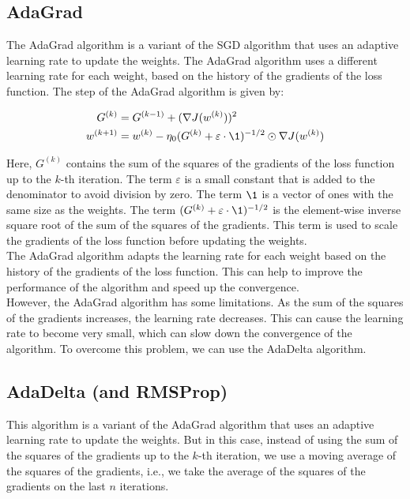 \subsection{AdaGrad}

The AdaGrad algorithm is a variant of the SGD algorithm that uses an adaptive learning rate to
update the weights. The AdaGrad algorithm uses a different learning rate for each weight, based
on the history of the gradients of the loss function. The step of the AdaGrad algorithm is given
by:

\begin{equation}
    \begin{aligned}
        G^{(k)} &= G^{(k-1)} + (\nabla J(w^{(k)}))^2 \\
        w^{(k+1)} &= w^{(k)} - \eta_0 (G^{(k)} + \varepsilon \cdot \1)^{-1/2} \odot \nabla J(w^{(k)})
    \end{aligned}
\end{equation}

Here, $G^{(k)}$ contains the sum of the squares of the gradients of the loss function up to the
$k$-th iteration. The term $\varepsilon$ is a small constant that is added to the denominator to
avoid division by zero. The term $\1$ is a vector of ones with the same size as the weights. The
term $(G^{(k)} + \varepsilon \cdot \1)^{-1/2}$ is the element-wise inverse square root of the
sum of the squares of the gradients. This term is used to scale the gradients of the loss function
before updating the weights.\\

The AdaGrad algorithm adapts the learning rate for each weight based on the history of the gradients
of the loss function. This can help to improve the performance of the algorithm and speed up the
convergence.\\

However, the AdaGrad algorithm has some limitations. As the sum of the squares of the gradients increases, the learning rate decreases. This
can cause the learning rate to become very small, which can slow down the convergence of the
algorithm. To overcome this problem, we can use the AdaDelta algorithm.

\subsection{AdaDelta (and RMSProp)}

This algorithm is a variant of the AdaGrad algorithm that uses an adaptive learning rate to update
the weights. But in this case, instead of using the sum of the squares of the gradients up to the
$k$-th iteration, we use a moving average of the squares of the gradients, i.e., we take the average 
of the squares of the gradients on the last $n$ iterations.\\

